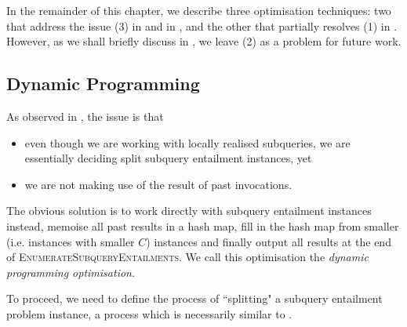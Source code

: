 \documentclass[12pt]{report}
\theoremstyle{plain}
\theoremstyle{definition}
\begin{document}
In the remainder of this chapter, we describe three optimisation techniques: two that address the issue (3) in  and in , and the other that partially resolves (1) in . However, as we shall briefly discuss in , we leave (2) as a problem for future work.

\subsection{Dynamic Programming}
\label{subsection:dp-optimisation}

As observed in , the issue is that
\begin{itemize}
  \item even though we are working with locally realised subqueries, we are essentially deciding split subquery entailment instances, yet
  \item we are not making use of the result of past invocations.
\end{itemize}

The obvious solution is to work directly with subquery entailment instances instead, memoise all past results in a hash map, fill in the hash map from smaller (i.e. instances with smaller $C$) instances and finally output all results at the end of \textsc{EnumerateSubqueryEntailments}. We call this optimisation the \emph{dynamic programming optimisation}.

To proceed, we need to define the process of ``splitting" a subquery entailment problem instance, a process which is necessarily similar to .
\end{document}
